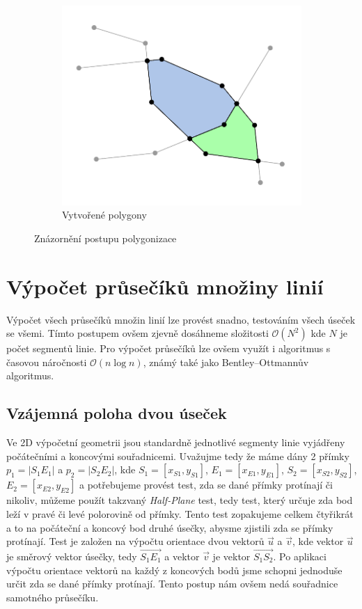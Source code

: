 \begin{figure}[h]
\begin{subfigure}{0.5\textwidth}
\end{subfigure}\hfil %
\begin{subfigure}{0.5\textwidth}
  \includegraphics[width=\linewidth]{./pictures/5/fuzzy_3.pdf}
  \caption{Vytvořené polygony}
  \label{fig:2-fuzzy_2}
\end{subfigure}\hfil %
\caption{Znázornění postupu polygonizace}
\end{figure}

\section{Výpočet průsečíků množiny linií}
Výpočet všech průsečíků množin linií lze provést snadno, testováním všech úseček se všemi. Tímto postupem ovšem zjevně dosáhneme složitosti $\mathcal{O}(N^2)$ kde $N$ je počet segmentů linie. Pro výpočet průsečíků lze ovšem využít i algoritmus s časovou náročnosti $\mathcal{O}(n\log{}n)$, známý také jako Bentley–Ottmannův algoritmus.

\subsection{Vzájemná poloha dvou úseček}
Ve 2D výpočetní geometrii jsou standardně jednotlivé segmenty linie vyjádřeny počátečními a koncovými souřadnicemi. Uvažujme tedy že máme dány 2 přímky $p_1 = |S_1 E_1|$ a $p_2 = |S_2 E_2|$, kde $S_1 = [x_{S1},y_{S1}]$, $E_1 = [x_{E1},y_{E1}]$, $S_2 = [x_{S2},y_{S2}]$, $E_2 = [x_{E2},y_{E2}]$ a potřebujeme provést test, zda se dané přímky protínají či nikoliv, můžeme použít takzvaný \textit{Half-Plane} test, tedy test, který určuje zda bod leží v pravé či levé polorovině od přímky. Tento test zopakujeme celkem čtyřikrát a to na počáteční a koncový bod druhé úsečky, abysme zjistili zda se přímky protínají. Test je založen na výpočtu orientace dvou vektorů $\vec{u}$  a $\vec{v}$, kde vektor $\vec{u}$ je směrový vektor úsečky, tedy $\overrightarrow{S_1E_1}$ a vektor $\vec{v}$ je vektor $\overrightarrow{S_1S_2}$. Po aplikaci výpočtu orientace vektorů na každý z koncových bodů jsme schopni jednoduše určit zda se dané přímky protínají. Tento postup nám ovšem nedá souřadnice samotného průsečíku.

